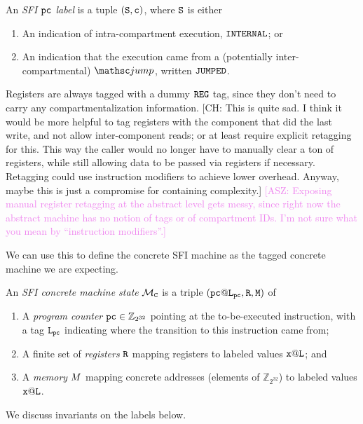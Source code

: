 \documentclass[12pt]{amsart}
\newif\ifdraft\drafttrue
\newcommand{\asz}[1]{\ifdraft\textcolor{violet}{[ASZ: #1]}\fi}
\newcommand*{\term}[1]{\emph{#1}}
\newcommand*{\Z}{\mathbb{Z}}
\newcommand{\comm}[3]{\ifdraft\textcolor{#1}{[#2: #3]}\fi}
\newcommand{\ch}[1]{\comm{dkgreen}{CH}{#1}} %
\begin{document}
\begin{definition}\label{def:sfi-pc-label}
  An \term{SFI $\mathtt{pc}$ label} is a tuple $(\mathtt{S}, \mathtt{c})$, where
  $\mathtt{S}$ is either
  \begin{enumerate}
  \item An indication of intra-compartment execution, $\mathtt{INTERNAL}$; or
  \item An indication that the execution came from a (potentially
    inter-compartmental) $\opcode{jump}$, written $\mathtt{JUMPED}$.
  \end{enumerate}
\end{definition}

Registers are always tagged with a dummy $\mathtt{REG}$ tag, since they don't
need to carry any compartmentalization information.
%
\ch{This is quite sad. I think it would be more helpful to tag
  registers with the component that did the last write, and not allow
  inter-component reads; or at least require explicit retagging for
  this. This way the caller would no longer have to manually clear a
  ton of registers, while still allowing data to be passed via
  registers if necessary. Retagging could use instruction modifiers to
  achieve lower overhead. Anyway, maybe this is just a compromise for
  containing complexity.}%
\asz{Exposing manual register retagging at the abstract level gets messy, since
  right now the abstract machine has no notion of tags or of compartment IDs.
  I'm not sure what you mean by ``instruction modifiers''.}

We can use this to define the concrete SFI machine as the tagged concrete
machine we are expecting.

\begin{definition}
\label{def:sfi-concrete-machine-state}
  An \term{SFI concrete machine state} $\mathcal{M}_{\mathtt{C}}$ is a triple
  $(\Cpc@\Label_{\Cpc},\CRegisters,\CMemory)$ of
  \begin{enumerate}
  \item A \term{program counter} $\Cpc \in \Z_{2^{32}}$ pointing at the
    to-be-executed instruction, with a tag $\mathtt{L}_{\mathtt{pc}}$ indicating where the
    transition to this instruction came from;
  \item A finite set of \term{registers} $\mathtt{R}$ mapping registers to
    labeled values $\mathtt{x}@\mathtt{L}$; and
  \item A \term{memory} $M$ mapping concrete addresses (elements of
    $\Z_{2^{32}}$) to labeled values $\mathtt{x}@\mathtt{L}$.
  \end{enumerate}
  We discuss invariants on the labels below.
\end{definition}
\end{document}
